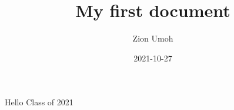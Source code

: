 \documentclass{article}
\title{My first document}
\date{2021-10-27}
\author{Zion Umoh}
\begin{document}
	\maketitle
	\newpage
	Hello Class of 2021
\end{document}
